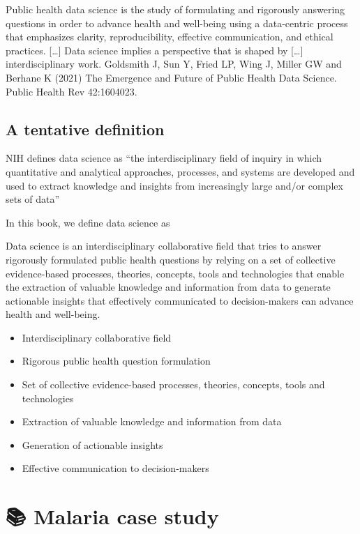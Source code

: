 \documentclass[
  letterpaper,
  DIV=11,
  numbers=noendperiod]{scrreprt}
\providecommand{\tightlist}{%
  \setlength{\itemsep}{0pt}\setlength{\parskip}{0pt}}\usepackage{longtable,booktabs,array}
\begin{document}
Public health data science is the study of formulating and rigorously
answering questions in order to advance health and well-being using a
data-centric process that emphasizes clarity, reproducibility, effective
communication, and ethical practices. {[}\ldots{]} Data science implies
a perspective that is shaped by {[}\ldots{]} interdisciplinary work.
Goldsmith J, Sun Y, Fried LP, Wing J, Miller GW and Berhane K (2021) The
Emergence and Future of Public Health Data Science. Public Health Rev
42:1604023.

\hypertarget{a-tentative-definition}{%
\section{A tentative definition}\label{a-tentative-definition}}

NIH defines data science as ``the interdisciplinary field of inquiry in
which quantitative and analytical approaches, processes, and systems are
developed and used to extract knowledge and insights from increasingly
large and/or complex sets of data''

In this book, we define data science as

Data science is an interdisciplinary collaborative field that tries to
answer rigorously formulated public health questions by relying on a set
of collective evidence-based processes, theories, concepts, tools and
technologies that enable the extraction of valuable knowledge and
information from data to generate actionable insights that effectively
communicated to decision-makers can advance health and well-being.

\begin{itemize}
\tightlist
\item
  Interdisciplinary collaborative field
\item
  Rigorous public health question formulation
\item
  Set of collective evidence-based processes, theories, concepts, tools
  and technologies
\item
  Extraction of valuable knowledge and information from data
\item
  Generation of actionable insights
\item
  Effective communication to decision-makers
\end{itemize}

\hypertarget{malaria-case-study}{%
\chapter{\texorpdfstring{{📚} Malaria case
study}{📚 Malaria case study}}\label{malaria-case-study}}
\end{document}
